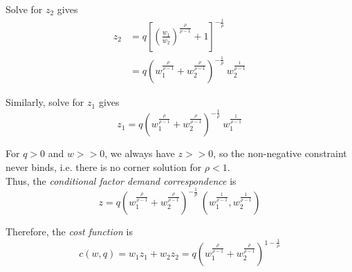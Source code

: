 \documentclass{article}
\begin{document}
\begin{enumerate}
Solve for $z_2$ gives
\begin{align*}
  z_2 &= q \left[\left(\frac{w_1}{w_2}\right)^
           {\frac{\rho}{\rho-1}}+1\right]^{-\frac{1}{\rho}} \\
      &= q \left(w_1^{\frac{\rho}{\rho-1}} + w_2^{\frac{\rho}{\rho-1}}\right)^
           {-\frac{1}{\rho}}\ w_2^{\frac{1}{\rho-1}}
\end{align*}

Similarly, solve for $z_1$ gives
\[ z_1 = q \left(w_1^{\frac{\rho}{\rho-1}} + w_2^{\frac{\rho}{\rho-1}}\right)^
             {-\frac{1}{\rho}}\ w_1^{\frac{1}{\rho-1}}
\]

For $q>0$ and $w>>0$, we always have $z>>0$, so the non-negative constraint 
never binds, i.e. there is no corner solution for $\rho<1$. \\

Thus, the \emph{conditional factor demand correspondence} is
\[ z = q \left(w_1^{\frac{\rho}{\rho-1}} + w_2^{\frac{\rho}{\rho-1}}\right)^
              {-\frac{1}{\rho}}\
        \left(w_1^{\frac{1}{\rho-1}}, w_2^{\frac{1}{\rho-1}} \right)
\]

Therefore, the \emph{cost function} is
\[ c(w,q) = w_1z_1 + w_2z_2
          = q\left( w_1^{\frac{\rho}{\rho-1}} +
                   w_2^{\frac{\rho}{\rho-1}}
            \right)^{1-\frac{1}{\rho}} 
\]
\end{enumerate}
\end{document}
